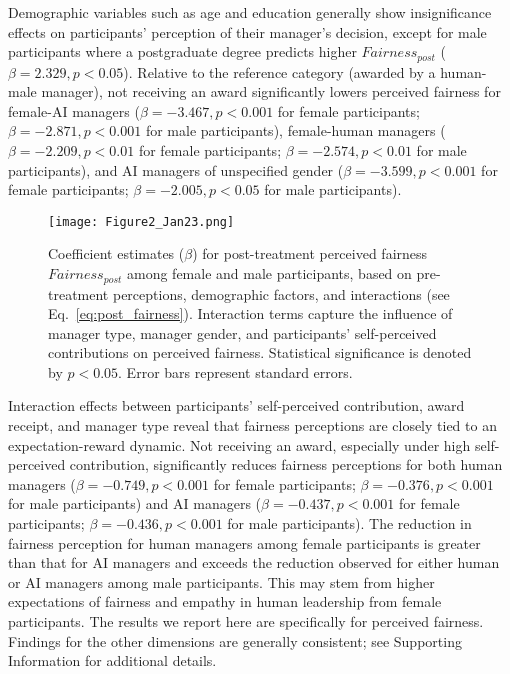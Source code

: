 \documentclass{article}
\begin{document}
Demographic variables such as age and education generally show insignificance effects on participants' perception of their manager's decision, except for male participants where a postgraduate degree predicts higher $Fairness_{post}$ ($\beta = 2.329, p < 0.05$). 
Relative to the reference category (awarded by a human-male manager), not receiving an award significantly lowers perceived fairness for female-AI managers ($\beta = -3.467, p < 0.001$ for female participants; $\beta = -2.871, p < 0.001$ for male participants), female-human managers ($\beta = -2.209, p < 0.01$ for female participants; $\beta = -2.574, p < 0.01$ for male participants), and AI managers of unspecified gender ($\beta = -3.599, p < 0.001$ for female participants; $\beta = -2.005, p < 0.05$ for male participants). 

\begin{figure}[htbp] 
    \centering
    \texttt{[image: Figure2\_Jan23.png]} %
    \caption{
    Coefficient estimates ($\beta$) for post-treatment perceived fairness $Fairness_{post}$ among female and male participants, based on pre-treatment perceptions, demographic factors, and interactions (see Eq.~\ref{eq:post_fairness}).
    Interaction terms capture the influence of manager type, manager gender, and participants' self-perceived contributions on perceived fairness. Statistical significance is denoted by $p<0.05$. Error bars represent standard errors.
    } 
    \label{fig:fig2} 
\end{figure} 

Interaction effects between participants' self-perceived contribution, award receipt, and manager type reveal that fairness perceptions are closely tied to an expectation-reward dynamic. Not receiving an award, especially under high self-perceived contribution, significantly reduces fairness perceptions for both human managers ($\beta = -0.749, p < 0.001$ for female participants; $\beta = -0.376, p < 0.001$ for male participants) and AI managers ($\beta = -0.437, p < 0.001$ for female participants; $\beta = -0.436, p < 0.001$ for male participants). 
The reduction in fairness perception for human managers among female participants is greater than that for AI managers and exceeds the reduction observed for either human or AI managers among male participants.
This may stem from higher expectations of fairness and empathy in human leadership from female participants. 
The results we report here are specifically for perceived fairness. Findings for the other dimensions are generally consistent; see Supporting Information for additional details.
\end{document}
